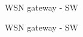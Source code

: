 \documentclass{beamer}
\begin{document}
  \begin{frame} {WSN gateway - SW}

	{\fontsize{5}{6}\selectfont 
	
	
	
	
	}


  \end{frame}



  \begin{frame} {WSN gateway - SW}



  \end{frame}



  	
%   	 
% 	 
  	
\end{document}
